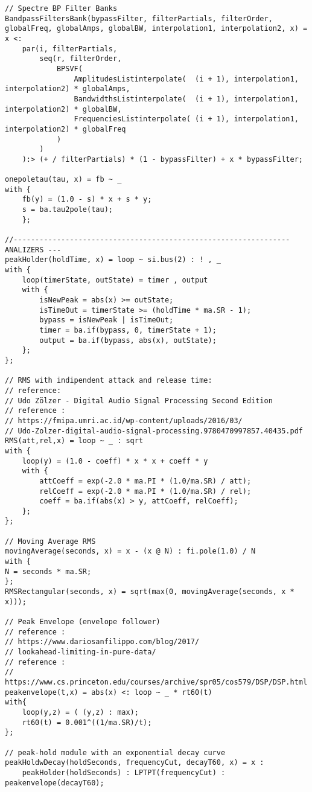 \begin{lstlisting}
// Spectre BP Filter Banks
BandpassFiltersBank(bypassFilter, filterPartials, filterOrder, globalFreq, globalAmps, globalBW, interpolation1, interpolation2, x) = x <: 
    par(i, filterPartials, 
        seq(r, filterOrder, 
            BPSVF( 
                AmplitudesListinterpolate(  (i + 1), interpolation1, interpolation2) * globalAmps, 
                BandwidthsListinterpolate(  (i + 1), interpolation1, interpolation2) * globalBW, 
                FrequenciesListinterpolate( (i + 1), interpolation1, interpolation2) * globalFreq
            ) 
        )
    ):> (+ / filterPartials) * (1 - bypassFilter) + x * bypassFilter;

onepoletau(tau, x) = fb ~ _ 
with {  
    fb(y) = (1.0 - s) * x + s * y; 
    s = ba.tau2pole(tau);
    };
    
//---------------------------------------------------------------- ANALIZERS ---
peakHolder(holdTime, x) = loop ~ si.bus(2) : ! , _
with {
    loop(timerState, outState) = timer , output
    with {
        isNewPeak = abs(x) >= outState;
        isTimeOut = timerState >= (holdTime * ma.SR - 1);
        bypass = isNewPeak | isTimeOut;
        timer = ba.if(bypass, 0, timerState + 1);
        output = ba.if(bypass, abs(x), outState);
    };
};

// RMS with indipendent attack and release time:
// reference:
// Udo Zölzer - Digital Audio Signal Processing Second Edition
// reference :
// https://fmipa.umri.ac.id/wp-content/uploads/2016/03/
// Udo-Zolzer-digital-audio-signal-processing.9780470997857.40435.pdf
RMS(att,rel,x) = loop ~ _ : sqrt
with {
    loop(y) = (1.0 - coeff) * x * x + coeff * y
    with {
        attCoeff = exp(-2.0 * ma.PI * (1.0/ma.SR) / att);
        relCoeff = exp(-2.0 * ma.PI * (1.0/ma.SR) / rel);
        coeff = ba.if(abs(x) > y, attCoeff, relCoeff);
    };
};

// Moving Average RMS
movingAverage(seconds, x) = x - (x @ N) : fi.pole(1.0) / N
with {
N = seconds * ma.SR;
};
RMSRectangular(seconds, x) = sqrt(max(0, movingAverage(seconds, x * x)));

// Peak Envelope (envelope follower)
// reference :
// https://www.dariosanfilippo.com/blog/2017/
// lookahead-limiting-in-pure-data/
// reference :
// https://www.cs.princeton.edu/courses/archive/spr05/cos579/DSP/DSP.html
peakenvelope(t,x) = abs(x) <: loop ~ _ * rt60(t)
with{
    loop(y,z) = ( (y,z) : max);
    rt60(t) = 0.001^((1/ma.SR)/t);
};

// peak-hold module with an exponential decay curve
peakHoldwDecay(holdSeconds, frequencyCut, decayT60, x) = x : 
    peakHolder(holdSeconds) : LPTPT(frequencyCut) : peakenvelope(decayT60);


\end{lstlisting}
